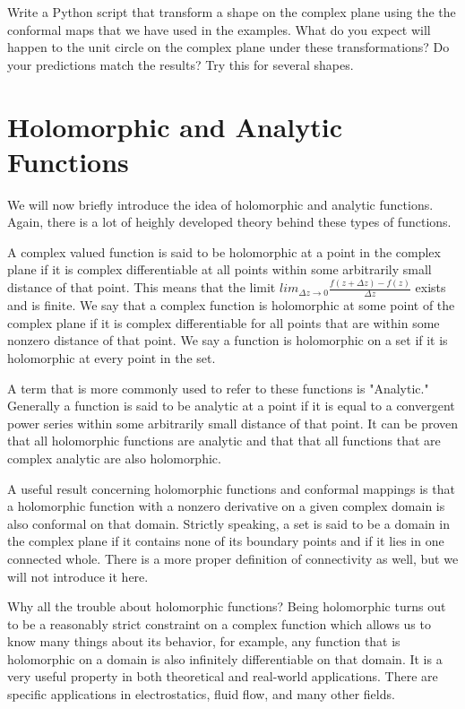 \begin{problem}
Write a Python script that transform a shape on the complex plane using the the conformal maps that we have used in the examples.  What do you expect will happen to the unit circle on the complex plane under these transformations?  Do your predictions match the results?  Try this for several shapes.
\end{problem}

\section*{Holomorphic and Analytic Functions}

We will now briefly introduce the idea of holomorphic and analytic functions. Again, there is a lot of heighly developed theory behind these types of functions.

A complex valued function is said to be holomorphic at a point in the complex plane if it is complex differentiable at all points within some arbitrarily small distance of that point. This means that the limit $lim_{\Delta z \to 0} \frac{f(z+\Delta z)-f(z)}{\Delta z}$ exists and is finite. We say that a complex function is holomorphic at some point of the complex plane if it is complex differentiable for all points that are within some nonzero distance of that point. We say a function is holomorphic on a set if it is holomorphic at every point in the set.

A term that is more commonly used to refer to these functions is "Analytic." Generally a function is said to be analytic at a point if it is equal to a convergent power series within some arbitrarily small distance of that point. It can be proven that all holomorphic functions are analytic and that that all functions that are complex analytic are also holomorphic.

A useful result concerning holomorphic functions and conformal mappings is that a holomorphic function with a nonzero derivative on a given complex domain is also conformal on that domain. Strictly speaking, a set is said to be a domain in the complex plane if it contains none of its boundary points and if it lies in one connected whole. There is a more proper definition of connectivity as well, but we will not introduce it here.

Why all the trouble about holomorphic functions? Being holomorphic turns out to be a reasonably strict constraint on a complex function which allows us to know many things about its behavior, for example, any function that is holomorphic on a domain is also infinitely differentiable on that domain. It is a very useful property in both theoretical and real-world applications. There are specific applications in electrostatics, fluid flow, and many other fields.

